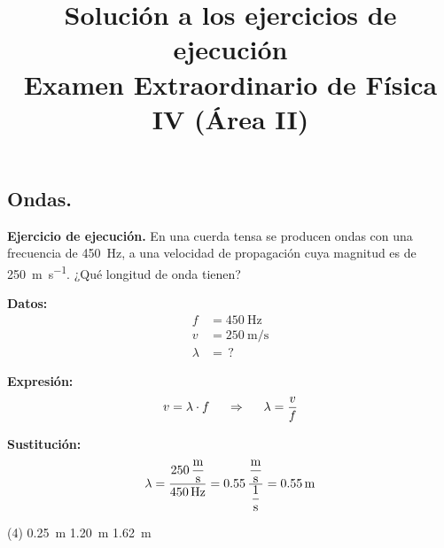 \documentclass[12pt]{exam}
\author{}
\date{}
\title{Solución a los ejercicios de ejecución \\ Examen Extraordinario de Física IV (Área II)}
\begin{document}
\maketitle

\setcounter{page}{2}

\begin{questions}


    \section{Ondas.}


    \setcounter{question}{3} \question \textbf{Ejercicio de ejecución.} En una cuerda tensa se producen ondas con una frecuencia de \SI{450}{\hertz}, a una velocidad de propagación cuya magnitud es de \SI{250}{\meter\per\second}. ¿Qué longitud de onda tienen?

    \vspace*{0.3cm}
    \begin{minipage}[t]{0.35\linewidth}
    \textbf{Datos:}
    \begin{align*}
    f &= \SI{450}{\hertz} \\
    v &= \SI{250}{\meter\per\second} \\
    \lambda &= \, ?
    \end{align*}
    \end{minipage}
    \hspace{1cm}
    \begin{minipage}[t]{0.4\linewidth}
    \textbf{Expresión:}
    \begin{align*}
    v = \lambda \cdot f \hspace{0.5cm} \Rightarrow \hspace{0.5cm} \lambda = \dfrac{v}{f}
    \end{align*}
    \end{minipage}

    \vspace*{0.3cm}
    \textbf{Sustitución:}
    \begin{align*}
    \lambda = \dfrac{\displaystyle \SI[per-mode=fraction]{250}{\meter\per\second}}{\SI{450}{\hertz}} = 0.55 \, \dfrac{ \displaystyle \unit[per-mode=fraction]{\meter\per\second}}{ \displaystyle \unit[per-mode=fraction]{\per\second}} = \SI{0.55}{\meter}
    \end{align*}
    \begin{tasks}(4)
       \task \SI{0.25}{\meter}
       \task {}
       \task \SI{1.20}{\meter}
       \task \SI{1.62}{\meter}
    \end{tasks}


\end{questions}
\end{document}
